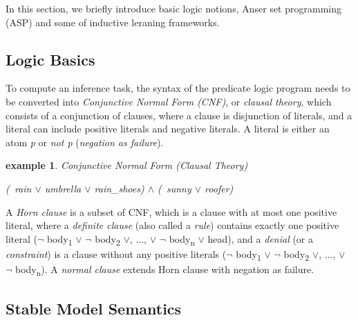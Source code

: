 \documentclass[12pt,twoside]{report}
\newtheorem{examp}{example}[section]
\begin{document}
In this section, we briefly introduce basic logic notions, Anser set programming (ASP) and some of inductive leraning frameworks.

\subsection{Logic Basics}


To compute an inference task, the syntax of the predicate logic program needs to be converted into \textit{Conjunctive Normal Form (CNF)}, or \textit{clausal theory}, which consists of a conjunction of clauses, where a clause is disjunction of literals, and a literal can include positive literals and negative literals. A literal is either an atom \textit{p} or \textit{not p} (\textit{negation as failure}).

\begin{examp} \normalfont Conjunctive Normal Form (Clausal Theory)
\begin{center}
 \textit{(~rain $\vee$ umbrella $\vee$ rain\_shoes) $\wedge$ (~sunny $\vee$ roofer)}
\end{center}
\end{examp}

A \textit{Horn clause} is a subset of CNF, which is a clause with at most one positive literal, where a \textit{definite clause} (also called a \textit{rule}) contains exactly one positive literal ($\neg$ body\textsubscript{1} $\vee$ $\neg$ body\textsubscript{2} $\vee$, ..., $\vee$ $\neg$ body\textsubscript{n} $\vee$ head), and a \textit{denial} (or a \textit{constraint}) is a clause without any positive literals ($\neg$ body\textsubscript{1} $\vee$ $\neg$ body\textsubscript{2} $\vee$, ..., $\vee$ $\neg$ body\textsubscript{n}).
A \textit{normal clause} extends Horn clause with negation as failure.

\subsection{Stable Model Semantics}
\end{document}
